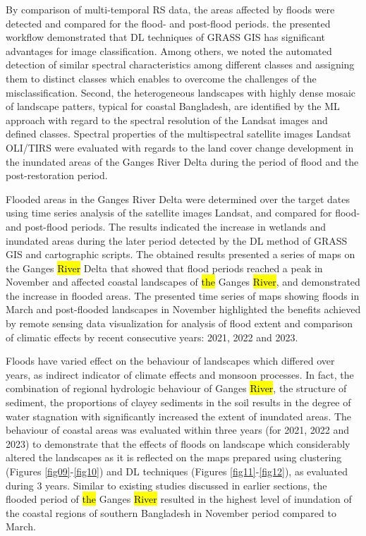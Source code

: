 \documentclass[water,article,submit,pdftex,moreauthors]{Definitions/mdpi}
\begin{document}
By comparison of multi-temporal RS data, the areas affected by floods were detected and compared for the flood- and post-flood periods. the presented workflow demonstrated that DL techniques of GRASS GIS  has significant advantages for image classification. Among others, we noted the automated detection of similar spectral characteristics among different classes and assigning them to distinct classes which enables to overcome the challenges of the misclassification. Second, the heterogeneous landscapes with highly dense mosaic of landscape patters, typical for coastal Bangladesh, are identified by the ML approach with regard to the spectral resolution of the Landsat images and defined classes. Spectral properties of the multispectral satellite images Landsat OLI/TIRS  were evaluated with regards to the land cover change development in the inundated areas of the Ganges River Delta during the period of flood and the post-restoration period. 

Flooded areas in the Ganges River Delta were determined over the target dates using time series analysis of the satellite images Landsat, and compared for flood- and post-flood periods. The results indicated the increase in wetlands and inundated areas during the later period detected by the DL method of GRASS GIS and cartographic scripts. The obtained results presented a series of maps on the Ganges \hl{River} Delta that showed that flood periods reached a peak in November and affected coastal landscapes of \hl{the }Ganges \hl{River}, and demonstrated the increase in flooded areas. The presented time series of maps showing floods in March and post-flooded landscapes in November highlighted the benefits achieved by remote sensing data visualization for analysis of flood extent and comparison of climatic effects by recent consecutive years: 2021, 2022 and 2023. 

Floods have varied effect on the behaviour of landscapes which differed over years, as indirect indicator of climate effects and monsoon processes. In fact, the combination of regional hydrologic behaviour of Ganges \hl{River}, the structure of sediment, the proportions of clayey sediments in the soil results in the degree of water stagnation with significantly increased the extent of inundated areas. The behaviour of coastal areas was evaluated within three years (for 2021, 2022 and 2023) to demonstrate that the effects of floods on landscape which considerably altered the landscapes as it is reflected on the maps prepared using clustering (Figures \ref{fig09}-\ref{fig10}) and DL techniques (Figures \ref{fig11}-\ref{fig12}), as evaluated during 3 years. Similar to existing studies discussed in earlier sections, the flooded period of \hl{the }Ganges \hl{River} resulted in the highest level of inundation of the coastal regions of southern Bangladesh in November period compared to March. 
\end{document}

